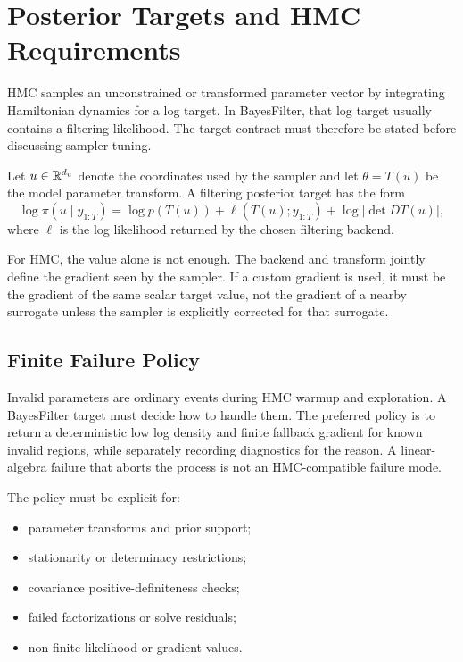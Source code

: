 \chapter{Posterior Targets and HMC Requirements}
\label{ch:bf-hmc-target-requirements}

HMC samples an unconstrained or transformed parameter vector by integrating
Hamiltonian dynamics for a log target.  In BayesFilter, that log target usually
contains a filtering likelihood.  The target contract must therefore be stated
before discussing sampler tuning.

\begin{definition}
\label{def:bf-filtering-target}
Let $u \in \mathbb{R}^{d_u}$ denote the coordinates used by the sampler and let
$\theta = T(u)$ be the model parameter transform.  A filtering posterior target
has the form
\[
  \log \pi(u \mid y_{1:T})
  =
  \log p(T(u))
  + \ell(T(u); y_{1:T})
  + \log\left|\det DT(u)\right|,
\]
where $\ell$ is the log likelihood returned by the chosen filtering backend.
\end{definition}

For HMC, the value alone is not enough.  The backend and transform jointly
define the gradient seen by the sampler.  If a custom gradient is used, it must
be the gradient of the same scalar target value, not the gradient of a nearby
surrogate unless the sampler is explicitly corrected for that surrogate.

\section{Finite Failure Policy}
\label{sec:bf-finite-failure-policy}

Invalid parameters are ordinary events during HMC warmup and exploration.  A
BayesFilter target must decide how to handle them.  The preferred policy is to
return a deterministic low log density and finite fallback gradient for known
invalid regions, while separately recording diagnostics for the reason.  A
linear-algebra failure that aborts the process is not an HMC-compatible failure
mode.

The policy must be explicit for:
\begin{itemize}
  \item parameter transforms and prior support;
  \item stationarity or determinacy restrictions;
  \item covariance positive-definiteness checks;
  \item failed factorizations or solve residuals;
  \item non-finite likelihood or gradient values.
\end{itemize}

